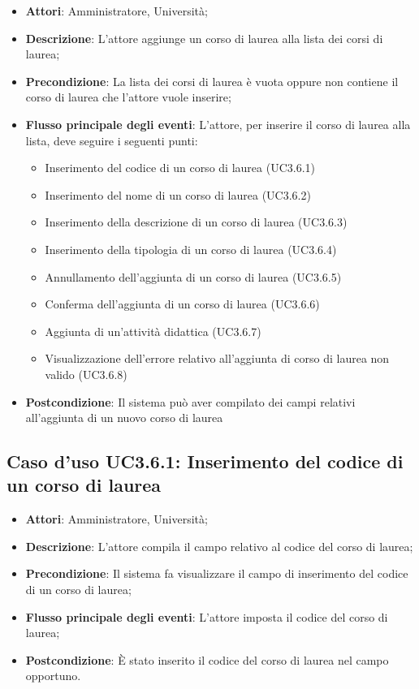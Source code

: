 \begin{itemize}
\item \textbf{Attori}: Amministratore, Università;
\item \textbf{Descrizione}: L'attore aggiunge un corso di laurea alla lista dei corsi di laurea;
\item \textbf{Precondizione}: La lista dei corsi di laurea è vuota oppure non contiene il corso di laurea che l'attore vuole inserire;
\item \textbf{Flusso principale degli eventi}: L'attore, per inserire il corso di laurea alla lista, deve seguire i seguenti punti:
\begin{itemize}
\item Inserimento del codice di un corso di laurea (UC3.6.1)
\item Inserimento del nome di un corso di laurea (UC3.6.2)
\item Inserimento della descrizione di un corso di laurea (UC3.6.3)
\item Inserimento della tipologia di un corso di laurea (UC3.6.4)
\item Annullamento dell'aggiunta di un corso di laurea (UC3.6.5)
\item Conferma dell’aggiunta di un corso di laurea (UC3.6.6)
\item Aggiunta di un'attività didattica (UC3.6.7)
\item Visualizzazione dell'errore relativo all’aggiunta di corso di laurea non valido  (UC3.6.8)
\end{itemize}
\item \textbf{Postcondizione}: Il sistema può aver compilato dei campi relativi all'aggiunta di un nuovo corso di laurea
\end{itemize}
\subsection{Caso d'uso \texorpdfstring{UC3.6.1}{UC3.6.1}: Inserimento del codice di un corso di laurea}
\begin{itemize}
\item \textbf{Attori}: Amministratore, Università;
\item \textbf{Descrizione}: L'attore compila il campo relativo al codice del corso di laurea;
\item \textbf{Precondizione}: Il sistema fa visualizzare il campo di inserimento del codice di un corso di laurea;
\item \textbf{Flusso principale degli eventi}: L'attore imposta il codice del corso di laurea;
\item \textbf{Postcondizione}: È stato inserito il codice del corso di laurea nel campo opportuno.
\end{itemize}
